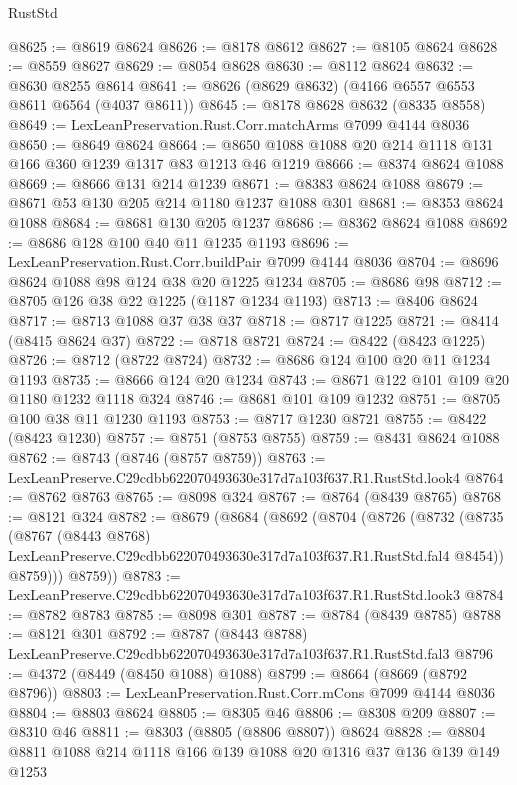 \begin{lexlean}{RustStd}
\begin{coremodule}
@8625 := @8619 @8624
@8626 := @8178 @8612
@8627 := @8105 @8624
@8628 := @8559 @8627
@8629 := @8054 @8628
@8630 := @8112 @8624
@8632 := @8630 @8255 @8614
@8641 := @8626 (@8629 @8632) (@4166 @6557 @6553 @8611 @6564 (@4037 @8611))
@8645 := @8178 @8628 @8632 (@8335 @8558)
@8649 := LexLeanPreservation.Rust.Corr.matchArms @7099 @4144 @8036
@8650 := @8649 @8624
@8664 := @8650 @1088 @1088 @20 @214 @1118 @131 @166 @360 @1239 @1317 @83 @1213 @46 @1219
@8666 := @8374 @8624 @1088
@8669 := @8666 @131 @214 @1239
@8671 := @8383 @8624 @1088
@8679 := @8671 @53 @130 @205 @214 @1180 @1237 @1088 @301
@8681 := @8353 @8624 @1088
@8684 := @8681 @130 @205 @1237
@8686 := @8362 @8624 @1088
@8692 := @8686 @128 @100 @40 @11 @1235 @1193
@8696 := LexLeanPreservation.Rust.Corr.buildPair @7099 @4144 @8036
@8704 := @8696 @8624 @1088 @98 @124 @38 @20 @1225 @1234
@8705 := @8686 @98
@8712 := @8705 @126 @38 @22 @1225 (@1187 @1234 @1193)
@8713 := @8406 @8624
@8717 := @8713 @1088 @37 @38 @37
@8718 := @8717 @1225
@8721 := @8414 (@8415 @8624 @37)
@8722 := @8718 @8721
@8724 := @8422 (@8423 @1225)
@8726 := @8712 (@8722 @8724)
@8732 := @8686 @124 @100 @20 @11 @1234 @1193
@8735 := @8666 @124 @20 @1234
@8743 := @8671 @122 @101 @109 @20 @1180 @1232 @1118 @324
@8746 := @8681 @101 @109 @1232
@8751 := @8705 @100 @38 @11 @1230 @1193
@8753 := @8717 @1230 @8721
@8755 := @8422 (@8423 @1230)
@8757 := @8751 (@8753 @8755)
@8759 := @8431 @8624 @1088
@8762 := @8743 (@8746 (@8757 @8759))
@8763 := LexLeanPreserve.C29cdbb622070493630e317d7a103f637.R1.RustStd.look4
@8764 := @8762 @8763
@8765 := @8098 @324
@8767 := @8764 (@8439 @8765)
@8768 := @8121 @324
@8782 := @8679
    (@8684
      (@8692
        (@8704
          (@8726
            (@8732
              (@8735
                (@8767
                  (@8443 @8768)
                  LexLeanPreserve.C29cdbb622070493630e317d7a103f637.R1.RustStd.fal4
                  @8454))
              @8759)))
        @8759))
@8783 := LexLeanPreserve.C29cdbb622070493630e317d7a103f637.R1.RustStd.look3
@8784 := @8782 @8783
@8785 := @8098 @301
@8787 := @8784 (@8439 @8785)
@8788 := @8121 @301
@8792 := @8787 (@8443 @8788) LexLeanPreserve.C29cdbb622070493630e317d7a103f637.R1.RustStd.fal3
@8796 := @4372 (@8449 (@8450 @1088) @1088)
@8799 := @8664 (@8669 (@8792 @8796))
@8803 := LexLeanPreservation.Rust.Corr.mCons @7099 @4144 @8036
@8804 := @8803 @8624
@8805 := @8305 @46
@8806 := @8308 @209
@8807 := @8310 @46
@8811 := @8303 (@8805 (@8806 @8807)) @8624
@8828 := @8804
    @8811
    @1088
    @214
    @1118
    @166
    @139
    @1088
    @20
    @1316
    @37
    @136
    @139
    @149
    @1253

\end{coremodule}
\end{lexlean}
